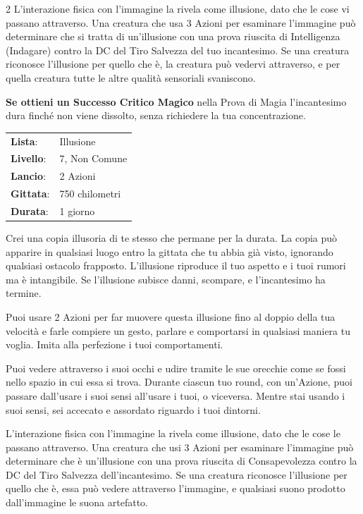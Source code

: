 \begin{multicols}{2}
L'interazione fisica con l'immagine la rivela come illusione, dato che le cose vi passano attraverso. Una creatura che usa 3 Azioni per esaminare l'immagine può determinare che si tratta di un'illusione con una prova riuscita di Intelligenza (Indagare) contro la DC del Tiro Salvezza del tuo incantesimo. Se una creatura riconosce l'illusione per quello che è, la creatura può vedervi attraverso, e per quella creatura tutte le altre qualità sensoriali svaniscono.

\textbf{Se ottieni un Successo Critico Magico} nella Prova di Magia l'incantesimo dura finché non viene dissolto, senza richiedere la tua concentrazione.

\noindent\begin{tabularx}{\linewidth}{p{1.9cm}X}
	\rowcolor{gray!20}\textbf{Lista}: & Illusione \\
	\textbf{Livello}: & 7, Non Comune \\
	\rowcolor{gray!20}\textbf{Lancio}: & 2 Azioni \\
	\textbf{Gittata}: & 750 chilometri \\
	\rowcolor{gray!20}\textbf{Durata}: & 1 giorno \\
\end{tabularx}\smallskip

Crei una copia illusoria di te stesso che permane per la durata. La copia può apparire in qualsiasi luogo entro la gittata che tu abbia già visto, ignorando qualsiasi ostacolo frapposto. L'illusione riproduce il tuo aspetto e i tuoi rumori ma è intangibile. Se l'illusione subisce danni, scompare, e l'incantesimo ha termine.

Puoi usare 2 Azioni per far muovere questa illusione fino al doppio della tua velocità e farle compiere un gesto, parlare e comportarsi in qualsiasi maniera tu voglia. Imita alla perfezione i tuoi comportamenti.

Puoi vedere attraverso i suoi occhi e udire tramite le sue orecchie come se fossi nello spazio in cui essa si trova. Durante ciascun tuo round, con un'Azione, puoi passare dall'usare i suoi sensi all'usare i tuoi, o viceversa. Mentre stai usando i suoi sensi, sei accecato e assordato riguardo i tuoi dintorni.

L'interazione fisica con l'immagine la rivela come illusione, dato che le cose le passano attraverso. Una creatura che usi 3 Azioni per esaminare l'immagine può determinare che è un'illusione con una prova riuscita di Consapevolezza contro la DC del Tiro Salvezza dell'incantesimo. Se una creatura riconosce l'illusione per quello che è, essa può vedere attraverso l'immagine, e qualsiasi suono prodotto dall'immagine le suona artefatto.


\end{multicols}
